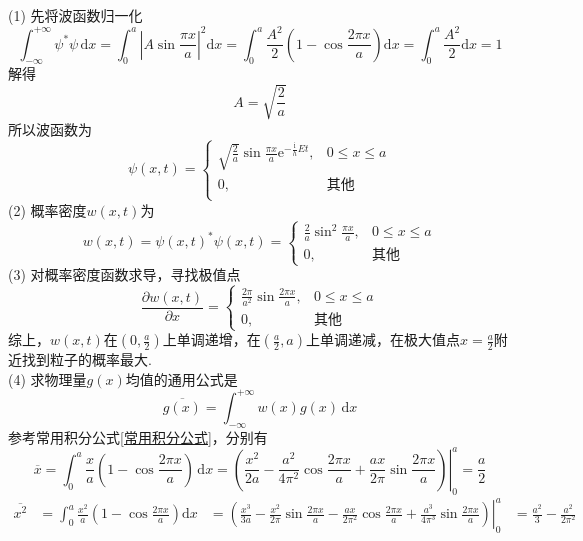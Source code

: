 \begin{solution}
    (1) 先将波函数归一化
    $$
        \int_{-\infty}^{+\infty}\psi^*\psi\,\mathrm{d}x
        =\int_0^a\left|A\sin\frac{\pi x}{a}\right|^2\mathrm{d}x
        =\int_0^a\frac{A^2}{2}\left(1-\cos\frac{2\pi x}{a}\right)\mathrm{d}x
        =\int_0^a\frac{A^2}{2}\mathrm{d}x
        =1
    $$
    解得
    $$
        A = \sqrt{\frac{2}{a}}
    $$
    所以波函数为
    $$
        \psi(x, t) = \begin{cases}
            \sqrt{\frac{2}{a}}\sin\frac{\pi x}{a}\mathrm{e}^{-\frac{\mathrm{i}}{h}Et}, & 0 \leqslant x \leqslant a \\
            0,                                                                         & \text{其他}                 \\
        \end{cases}
    $$
    (2) 概率密度$w(x,t)$为
    $$
        w(x,t) = \psi(x,t)^*\psi(x,t) = \begin{cases}
            \frac{2}{a}\sin^2\frac{\pi x}{a}, & 0 \leqslant x \leqslant a \\
            0,                                & \text{其他}
        \end{cases}
    $$
    (3) 对概率密度函数求导，寻找极值点
    $$
        \frac{\partial w(x,t)}{\partial x} = \begin{cases}
            \frac{2\pi}{a^2}\sin\frac{2\pi x}{a}, & 0\leqslant x\leqslant a \\
            0,                                    & \text{其他}
        \end{cases}
    $$
    综上，$w(x, t)$在$\left(0,\frac{a}{2}\right)$上单调递增，在$\left(\frac{a}{2},a\right)$上单调递减，在极大值点$x=\frac{a}{2}$附近找到粒子的概率最大.\\
    (4) 求物理量$g(x)$均值的通用公式是
    $$
        \overline{g(x)} = \int_{-\infty}^{+\infty} w(x)g(x) \,\mathrm{d}x
    $$
    参考常用积分公式\ref{常用积分公式}，分别有
    $$
        \overline{x}
        =\int_0^a\frac{x}{a}\left(1-\cos\frac{2\pi x}{a}\right)\,\mathrm{d}x
        =\left.\left(\frac{x^{2}}{2a}-\frac{a^{2}}{4\pi^{2}}\cos\frac{2\pi x}{a}+\frac{ax}{2\pi}\sin\frac{2\pi x}{a}\right)\right|_{0}^{a}
        =\frac{a}{2}
    $$
    $$%
        \begin{aligned}
            \overline{x^2}
             & =\int_0^a\frac{x^2}{a}\left(1-\cos\frac{2\pi x}{a}\right)\mathrm{d}x
             & =\left.\left(\frac{x^3}{3a}-\frac{x^2}{2\pi}\sin\frac{2\pi x}{a}-\frac{ax}{2\pi^2}\cos\frac{2\pi x}{a}+\frac{a^3}{4\pi^3}\sin\frac{2\pi x}{a}\right)\right|_0^a
             & = \frac{a^2}{3} - \frac{a^2}{2\pi^2}
        \end{aligned}
    $$
\end{solution}



